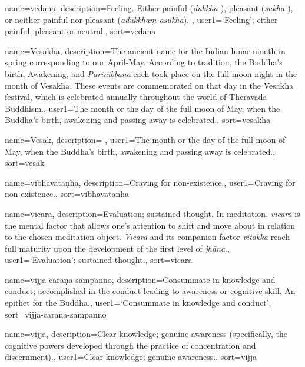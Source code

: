 {
name=vedan\=a,
description={Feeling. Either painful (\textit{dukkha-}), pleasant (\textit{sukha-}), or neither-painful-nor-pleasant (\textit{adukkha\d{m}-asukh\=a}). \protect \seepre %
\protect {}%
\protect \seepost %
},
user1={`Feeling'; either painful, pleasant or neutral.},
sort={vedana}
}

{
name={Ves\=akha},
description={The ancient name for the Indian lunar month in spring corresponding to our April-May. According to tradition, the Buddha's birth, Awakening, and \textit{Parinibb\=ana} each took place on the full-moon night in the month of Ves\=akha. These events are commemorated on that day in the Ves\=akha festival, which is celebrated annually throughout the world of Ther\=avada Buddhism.},
user1={The month or the day of the full moon of May, when the Buddha's birth, awakening and passing away is celebrated.},
sort={vesakha}
}

{
name=Vesak,
description={\nopostdesc \protect \seepre %
\protect {}%
\protect \seepost %
},
user1={The month or the day of the full moon of May, when the Buddha's birth, awakening and passing away is celebrated.},
sort={vesak}
}

{
name=vibhavata\d{n}h\=a,
description={Craving for non-existence.},
user1={Craving for non-existence.},
sort={vibhavatanha}
}

{
name={vic\=ara},
description={Evaluation; sustained thought. In meditation, \textit{vic\=ara} is the mental factor that allows one's attention to shift and move about in relation to the chosen meditation object. \textit{Vic\=ara} and its companion factor \textit{vitakka} reach full maturity upon the development of the first level of \textit{jh\=ana}.},
user1={`Evaluation'; sustained thought.},
sort={vicara}
}

{
name={vijj\=a-cara\d{n}a-sampanno},
description={Consummate in knowledge and conduct; accomplished in the conduct leading to awareness or cognitive skill. An epithet for the Buddha.},
user1={`Consummate in knowledge and conduct'},
sort={vijja-carana-sampanno}
}

{
name={vijj\=a},
description={Clear knowledge; genuine awareness (specifically, the cognitive powers developed through the practice of concentration and discernment).},
user1={Clear knowledge; genuine awareness.},
sort={vijja}
}

